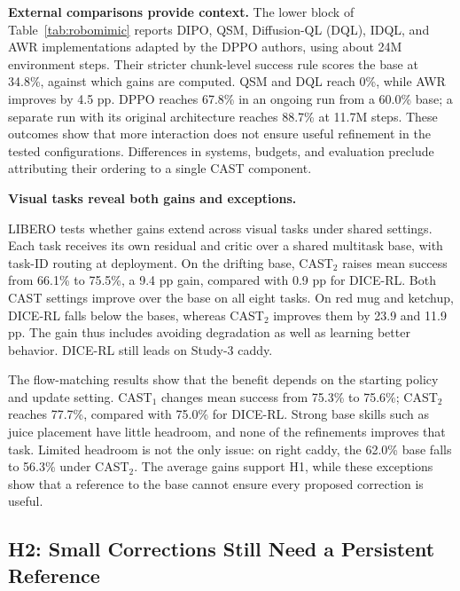 \textbf{External comparisons provide context.}
The lower block of Table~\ref{tab:robomimic} reports DIPO, QSM,
Diffusion-QL (DQL), IDQL, and AWR implementations adapted by the DPPO authors,
using about 24M environment steps. Their stricter chunk-level success
rule scores the base at 34.8\%, against which gains are computed. QSM
and DQL reach 0\%, while AWR improves by 4.5 pp. DPPO reaches 67.8\%
in an ongoing run from a 60.0\% base; a separate run with its original
architecture reaches 88.7\% at 11.7M steps. These outcomes show that more
interaction does not ensure useful refinement in the tested configurations.
Differences in systems, budgets, and evaluation preclude attributing their
ordering to a single CAST component.

\textbf{Visual tasks reveal both gains and exceptions.}
\label{sec:exp-libero}



LIBERO tests whether gains extend across visual tasks under shared settings.
Each task receives its own residual and critic over a shared multitask base,
with task-ID routing at deployment. On the drifting base, CAST$_2$ raises
mean success from 66.1\% to 75.5\%, a 9.4 pp gain, compared with 0.9 pp
for DICE-RL. Both CAST settings improve over the base on all eight tasks.
On red mug and ketchup, DICE-RL falls below the bases, whereas CAST$_2$
improves them by 23.9 and 11.9 pp. The gain thus includes avoiding
degradation as well as learning better behavior. DICE-RL still leads on
Study-3 caddy.

The flow-matching results show that the benefit depends on the starting
policy and update setting. CAST$_1$ changes mean success from 75.3\% to
75.6\%; CAST$_2$ reaches 77.7\%, compared with 75.0\% for DICE-RL.
Strong base skills such as juice placement have little headroom, and none
of the refinements improves that task. Limited headroom is not the only
issue: on right caddy, the 62.0\% base falls to 56.3\% under CAST$_2$.
The average gains support H1, while these exceptions show that a reference
to the base cannot ensure every proposed correction is useful.



\subsection{H2: Small Corrections Still Need a Persistent Reference}
\label{sec:exp-controls}


